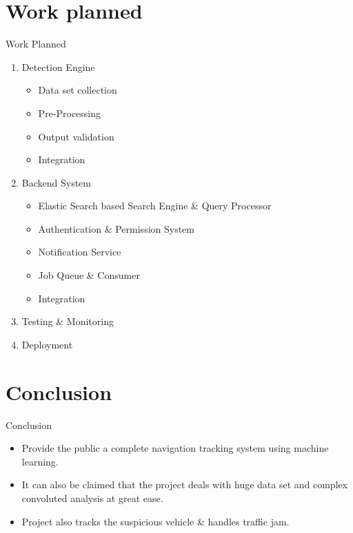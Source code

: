 \documentclass{beamer}
\begin{document}

\section{Work planned}
\begin{frame}{Work Planned}
\begin{enumerate}
	\item Detection Engine
		\begin{itemize}
			\item Data set collection
			\item Pre-Processing
			\item Output validation
			\item Integration
		\end{itemize}
	\item Backend System
		\begin{itemize}
			\item Elastic Search based Search Engine \& Query Processor 
			\item Authentication \& Permission System
			\item Notification Service
			\item Job Queue \& Consumer 
			\item Integration
		\end{itemize}
	\item Testing \& Monitoring
    \item Deployment
    

\end{enumerate}
\end{frame}


\section{Conclusion}
\begin{frame}{Conclusion}
\begin{itemize}
    \item Provide the public a complete navigation tracking system using machine learning.
    \item It can also be claimed that the project deals with huge data set and complex convoluted analysis at great ease.
    \item Project also tracks the suspicious vehicle \&
    handles traffic jam.
\end{itemize}
\end{frame}
\end{document}
